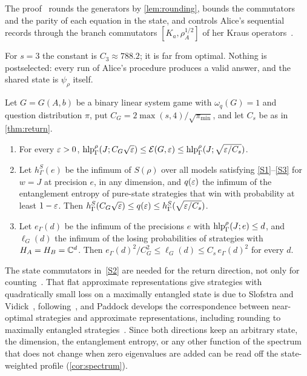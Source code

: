 The proof~\cite[Section~5.2]{DM-game} rounds the generators by \cref{lem:rounding}, bounds the commutators and the parity
of each equation in the state, and controls Alice's sequential records through the branch commutators $[K_a,\rho_A^{1/2}]$ of
her Kraus operators~\cite[Lemma~5.3]{DM-game}.

For $s=3$ the constant is $C_3\approx788.2$; it is far from optimal. Nothing is postselected: every run of Alice's
procedure produces a valid answer, and the shared state is $\psi_\rho$ itself.

\begin{corollary}\label{cor:correspondence}
Let $G=G(A,b)$ be a binary linear system game with $\omega_q(G)=1$ and question distribution $\pi$, put
$C_G=2\max(s,4)/\sqrt{\pi_{\min}}$, and let $C_s$ be as in \cref{thm:return}.
\begin{enumerate}[label=(\alph*),itemsep=1pt]
\item For every $\varepsilon>0$, $\operatorname{hlp}^\rho_\Gamma(J;C_G\sqrt{\varepsilon})\le\mathcal E(G,\varepsilon)\le\operatorname{hlp}^\rho_\Gamma(J;\sqrt{\varepsilon/C_s})$.
\item Let $h^S_\Gamma(e)$ be the infimum of $S(\rho)$ over all models satisfying \ref{S1}--\ref{S3} for $w=J$ at precision
$e$, in any dimension, and $q(\varepsilon)$ the infimum of the entanglement entropy of pure-state strategies that win with
probability at least $1-\varepsilon$. Then $h^S_\Gamma(C_G\sqrt{\varepsilon})\le q(\varepsilon)\le h^S_\Gamma(\sqrt{\varepsilon/C_s})$.
\item Let $e_\Gamma(d)$ be the infimum of the precisions $e$ with $\operatorname{hlp}^\rho_\Gamma(J;e)\le d$, and $\ell_G(d)$ the
infimum of the losing probabilities of strategies with $H_A=H_B=\mathbb C^d$. Then
$e_\Gamma(d)^2/C_G^2\le\ell_G(d)\le C_s\,e_\Gamma(d)^2$ for every $d$.
\end{enumerate}
\end{corollary}

The state commutators in~\ref{S2} are needed for the return direction, not only for counting~\cite[Example~5.6]{DM-game}.
That flat approximate representations give strategies with quadratically small loss on a maximally entangled state is due to
Slofstra and Vidick~\cite[Proposition~4.4(a)]{SV18}, following~\cite[Proposition~3.4]{Slo19}, and Paddock develops the
correspondence between near-optimal strategies and approximate representations, including rounding to maximally entangled
strategies~\cite{Pad22}. Since both directions keep an arbitrary state, the dimension, the entanglement entropy, or any other
function of the spectrum that does not change when zero eigenvalues are added can be read off the state-weighted profile
(\cref{cor:spectrum}).
